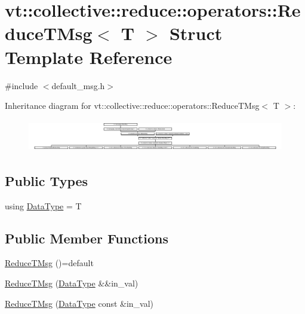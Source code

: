 \hypertarget{structvt_1_1collective_1_1reduce_1_1operators_1_1_reduce_t_msg}{}\section{vt\+:\+:collective\+:\+:reduce\+:\+:operators\+:\+:Reduce\+T\+Msg$<$ T $>$ Struct Template Reference}
\label{structvt_1_1collective_1_1reduce_1_1operators_1_1_reduce_t_msg}


{\ttfamily \#include $<$default\+\_\+msg.\+h$>$}

Inheritance diagram for vt\+:\+:collective\+:\+:reduce\+:\+:operators\+:\+:Reduce\+T\+Msg$<$ T $>$\+:\begin{figure}[H]
\begin{center}
\leavevmode
\includegraphics[height=1.403509cm]{structvt_1_1collective_1_1reduce_1_1operators_1_1_reduce_t_msg}
\end{center}
\end{figure}
\subsection*{Public Types}
\begin{DoxyCompactItemize}
\item 
using \hyperlink{structvt_1_1collective_1_1reduce_1_1operators_1_1_reduce_t_msg_ad9a7434e9e8b0afd4fcb13307058e698}{Data\+Type} = T
\end{DoxyCompactItemize}
\subsection*{Public Member Functions}
\begin{DoxyCompactItemize}
\item 
\hyperlink{structvt_1_1collective_1_1reduce_1_1operators_1_1_reduce_t_msg_ab7705a9ce2e1c1702021fa2e79b81493}{Reduce\+T\+Msg} ()=default
\item 
\hyperlink{structvt_1_1collective_1_1reduce_1_1operators_1_1_reduce_t_msg_a0ebf2a9f155512254ef185d2a8f57fd5}{Reduce\+T\+Msg} (\hyperlink{structvt_1_1collective_1_1reduce_1_1operators_1_1_reduce_t_msg_ad9a7434e9e8b0afd4fcb13307058e698}{Data\+Type} \&\&in\+\_\+val)
\item 
\hyperlink{structvt_1_1collective_1_1reduce_1_1operators_1_1_reduce_t_msg_afddd1ed7bed2d1946cacbf6b080696d4}{Reduce\+T\+Msg} (\hyperlink{structvt_1_1collective_1_1reduce_1_1operators_1_1_reduce_t_msg_ad9a7434e9e8b0afd4fcb13307058e698}{Data\+Type} const \&in\+\_\+val)
\end{DoxyCompactItemize}
